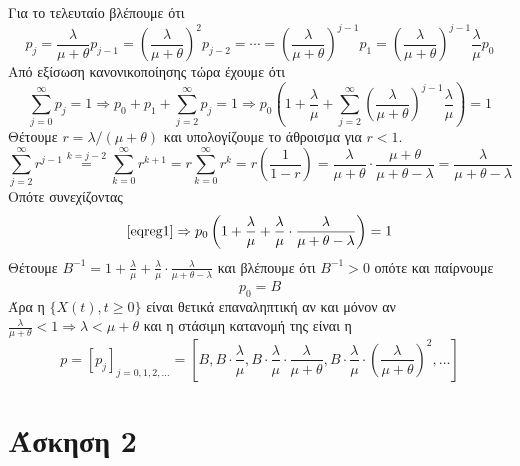 \documentclass[a4paper,11pt]{article}
\begin{document}
Για το τελευταίο βλέπουμε ότι
\[
	p_j = \frac{\lambda}{\mu+\theta} p_{j-1} = \left(\frac{\lambda}{\mu+\theta}\right)^2 p_{j-2} = \cdots = \left(\frac{\lambda}{\mu+\theta}\right)^{j-1} p_1 = \left(\frac{\lambda}{\mu+\theta}\right)^{j-1} \frac{\lambda}{\mu} p_0
\]
Από εξίσωση κανονικοποίησης τώρα έχουμε ότι
\begin{equation}
	\label{eqreg1}
	\sum_{j=0}^\infty p_j = 1 \Rightarrow p_0 + p_1 + \sum_{j=2}^\infty p_j = 1 \Rightarrow p_0 \left(1 + \frac{\lambda}{\mu} + \sum_{j=2}^\infty \left(\frac{\lambda}{\mu+\theta}\right)^{j-1} \frac{\lambda}{\mu} \right) = 1
\end{equation}
Θέτουμε $r = \lambda/(\mu+\theta)$ και υπολογίζουμε το άθροισμα για $r<1$.
\[
	\sum_{j=2}^\infty r^{j-1} \stackrel{k=j-2}{=}  \sum_{k=0}^\infty r^{k+1} = r \sum_{k=0}^\infty r^k = r \left(\frac{1}{1-r}\right) = \frac{\lambda}{\mu+\theta} \cdot \frac{\mu+\theta}{\mu+\theta-\lambda} = \frac{\lambda}{\mu+\theta-\lambda}
\]
Οπότε συνεχίζοντας
\[
	\eqref{eqreg1} \Rightarrow p_0 \left(1 + \frac{\lambda}{\mu} + \frac{\lambda}{\mu} \cdot \frac{\lambda}{\mu+\theta-\lambda} \right) = 1
\]
Θέτουμε $B^{-1} = 1 + \frac{\lambda}{\mu} + \frac{\lambda}{\mu} \cdot \frac{\lambda}{\mu+\theta-\lambda}$ και βλέπουμε ότι $B^{-1} > 0$ οπότε και παίρνουμε
\[p_0 = B\]
Άρα η $\{X(t),t\geq 0\}$ είναι θετικά επαναληπτική αν και μόνον αν $\frac{\lambda}{\mu+\theta} < 1 \Rightarrow \lambda < \mu+\theta$ και η στάσιμη κατανομή της είναι η
\[
	p = [p_j]_{j=0,1,2,\dots} = \left[B, B \cdot \frac{\lambda}{\mu}, B \cdot \frac{\lambda}{\mu} \cdot \frac{\lambda}{\mu+\theta}, B \cdot \frac{\lambda}{\mu} \cdot \left(\frac{\lambda}{\mu+\theta}\right)^2, \dots\right]
\]


\section*{Άσκηση 2}
\end{document}
